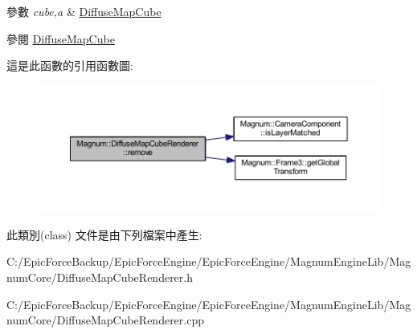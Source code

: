 \begin{DoxyParams}{參數}
{\em cube,a} & \hyperlink{class_magnum_1_1_diffuse_map_cube}{Diffuse\+Map\+Cube} \\
\hline
\end{DoxyParams}
\begin{DoxySeeAlso}{參閱}
\hyperlink{class_magnum_1_1_diffuse_map_cube}{Diffuse\+Map\+Cube} 
\end{DoxySeeAlso}


這是此函數的引用函數圖\+:\nopagebreak
\begin{figure}[H]
\begin{center}
\leavevmode
\includegraphics[width=350pt]{class_magnum_1_1_diffuse_map_cube_renderer_ac02b3206600e1825d321e213d96bcf81_cgraph}
\end{center}
\end{figure}




此類別(class) 文件是由下列檔案中產生\+:\begin{DoxyCompactItemize}
\item 
C\+:/\+Epic\+Force\+Backup/\+Epic\+Force\+Engine/\+Epic\+Force\+Engine/\+Magnum\+Engine\+Lib/\+Magnum\+Core/Diffuse\+Map\+Cube\+Renderer.\+h\item 
C\+:/\+Epic\+Force\+Backup/\+Epic\+Force\+Engine/\+Epic\+Force\+Engine/\+Magnum\+Engine\+Lib/\+Magnum\+Core/Diffuse\+Map\+Cube\+Renderer.\+cpp\end{DoxyCompactItemize}
